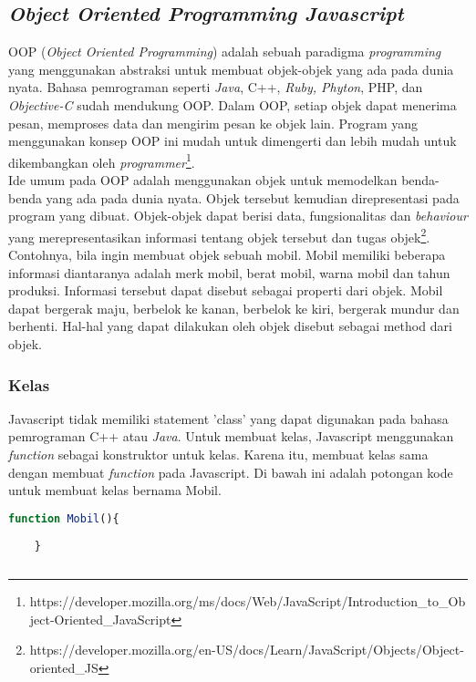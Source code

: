 \subsection{\textit{Object Oriented Programming Javascript}}
OOP (\textit{Object Oriented Programming}) adalah sebuah paradigma \textit{programming} yang menggunakan abstraksi untuk membuat objek-objek yang ada pada dunia nyata. Bahasa pemrograman seperti \textit{Java}, C++, \textit{Ruby, Phyton}, PHP, dan \textit{Objective-C} sudah mendukung OOP. Dalam OOP, setiap objek dapat menerima pesan, memproses data dan mengirim pesan ke objek lain. Program yang menggunakan konsep OOP ini mudah untuk dimengerti dan lebih mudah untuk dikembangkan oleh \textit{programmer}\footnote{https://developer.mozilla.org/ms/docs/Web/JavaScript/Introduction\_to\_Object-Oriented\_JavaScript}. \\

Ide umum pada OOP adalah menggunakan objek untuk memodelkan benda-benda yang ada pada dunia nyata. Objek tersebut kemudian direpresentasi pada program yang dibuat. Objek-objek dapat berisi data, fungsionalitas dan \textit{behaviour} yang merepresentasikan informasi tentang objek tersebut dan tugas objek\footnote{https://developer.mozilla.org/en-US/docs/Learn/JavaScript/Objects/Object-oriented\_JS}. Contohnya, bila ingin membuat objek sebuah mobil. Mobil memiliki beberapa informasi diantaranya adalah merk mobil, berat mobil, warna mobil dan tahun produksi. Informasi tersebut dapat disebut sebagai properti dari objek. Mobil dapat bergerak maju, berbelok ke kanan, berbelok ke kiri, bergerak mundur dan berhenti. Hal-hal yang dapat dilakukan oleh objek disebut sebagai method dari objek. 

\subsubsection{Kelas}
Javascript tidak memiliki statement 'class' yang dapat digunakan pada bahasa pemrograman C++ atau \textit{Java}. Untuk membuat kelas, Javascript menggunakan \textit{function} sebagai konstruktor untuk kelas. Karena itu, membuat kelas sama dengan membuat \textit{function} pada Javascript. Di bawah ini adalah potongan kode untuk membuat kelas bernama Mobil.

\begin{lstlisting}[language=Javascript, caption=Membuat kelas Mobil]
	function Mobil(){
	
	}
	
\end{lstlisting}

